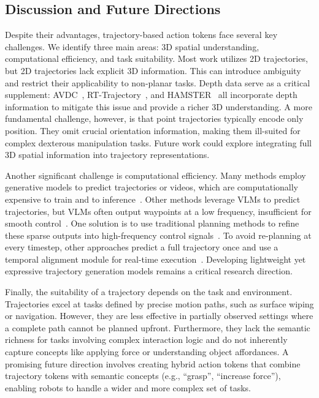 \documentclass[10pt, a4paper, logo, copyright]{googledeepmind} %
\begin{document}
\subsection{Discussion and Future Directions}

Despite their advantages, trajectory-based action tokens face several key challenges. We identify three main areas: 3D spatial understanding, computational efficiency, and task suitability. Most work utilizes 2D trajectories, but 2D trajectories lack explicit 3D information. This can introduce ambiguity and restrict their applicability to non-planar tasks. Depth data serve as a critical supplement: AVDC~\cite{ko2023avdc}, RT-Trajectory~\cite{rt-trajectory}, and HAMSTER~\cite{li2025hamster} all incorporate depth information to mitigate this issue and provide a richer 3D understanding. A more fundamental challenge, however, is that point trajectories typically encode only position. They omit crucial orientation information, making them ill-suited for complex dexterous manipulation tasks. Future work could explore integrating full 3D spatial information into trajectory representations.

Another significant challenge is computational efficiency. Many methods employ generative models to predict trajectories or videos, which are computationally expensive to train and to inference~\cite{ko2023avdc, wen2023any, xu2024flow}. Other methods leverage VLMs to predict trajectories, but VLMs often output waypoints at a low frequency, insufficient for smooth control~\cite{rt-trajectory, niu2024llarva, li2025hamster}. One solution is to use traditional planning methods to refine these sparse outputs into high-frequency control signals~\cite{tian2024drivevlm}. To avoid re-planning at every timestep, other approaches predict a full trajectory once and use a temporal alignment module for real-time execution~\cite{xu2024flow}. Developing lightweight yet expressive trajectory generation models remains a critical research direction.

Finally, the suitability of a trajectory depends on the task and environment. Trajectories excel at tasks defined by precise motion paths, such as surface wiping or navigation. However, they are less effective in partially observed settings where a complete path cannot be planned upfront. Furthermore, they lack the semantic richness for tasks involving complex interaction logic and do not inherently capture concepts like applying force or understanding object affordances. A promising future direction involves creating hybrid action tokens that combine trajectory tokens with semantic concepts (e.g., ``grasp'', ``increase force''), enabling robots to handle a wider and more complex set of tasks.
\end{document}
